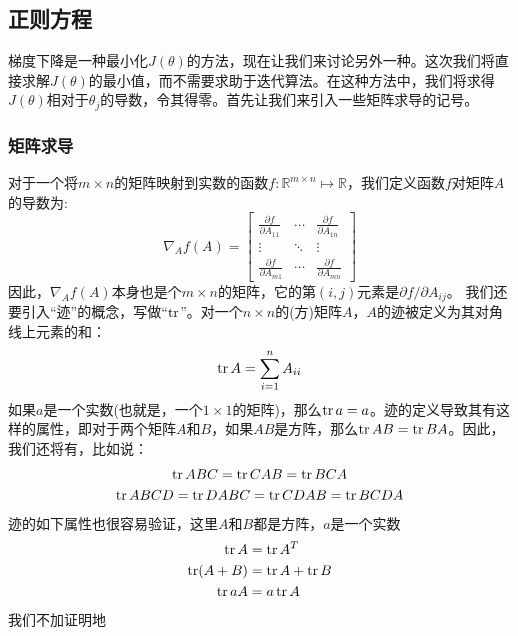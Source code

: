\subsection{正则方程}
梯度下降是一种最小化$J(\theta)$的方法，现在让我们来讨论另外一种。这次我们将直接求解$J(\theta)$的最小值，而不需要求助于迭代算法。在这种方法中，我们将求得$J(\theta)$相对于$\theta_j$的导数，令其得零。首先让我们来引入一些矩阵求导的记号。

\subsubsection{矩阵求导}
对于一个将$m \times n$的矩阵映射到实数的函数$f:\mathbb R^{m \times n} \mapsto \mathbb R$，我们定义函数$f$对矩阵$A$的导数为:
\begin{equation}
\nabla_Af(A) = 
\begin{bmatrix}
\frac{\partial f}{\partial A_{11}} & \cdots & \frac{\partial f}{\partial A_{1n}} \\
\vdots & \ddots & \vdots \\
\frac{\partial f}{\partial A_{m1}} & \cdots & \frac{\partial f}{\partial A_{mn}}
\end{bmatrix}
\end{equation}
因此，$\nabla_Af(A)$本身也是个$m \times n$的矩阵，它的第$(i, j)$元素是$\partial f/\partial A_{ij}$。
我们还要引入“迹”的概念，写做``$\operatorname{tr}$''。对一个$n \times n$的(方)矩阵$A$，$A$的迹被定义为其对角线上元素的和：
\begin{equation}
\operatorname{tr} A = \sum_{i = 1}^nA_{ii}
\end{equation}
如果$a$是一个实数(也就是，一个$1 \times 1$的矩阵)，那么$\operatorname{tr} a = a$。迹的定义导致其有这样的属性，即对于两个矩阵$A$和$B$，如果$AB$是方阵，那么$\operatorname{tr} AB = \operatorname{tr} BA$。因此，我们还将有，比如说：
\begin{gather*}
\operatorname{tr} ABC = \operatorname{tr} CAB = \operatorname{tr} BCA \\
\operatorname{tr} ABCD = \operatorname{tr} DABC = \operatorname{tr} CDAB = \operatorname{tr} BCDA
\end{gather*}
迹的如下属性也很容易验证，这里$A$和$B$都是方阵，$a$是一个实数
\begin{align}
\operatorname{tr} A &= \operatorname{tr} A^T \\
\operatorname{tr} (A + B) &= \operatorname{tr} A + \operatorname{tr} B \\
\operatorname{tr} aA &= a\operatorname{tr} A
\end{align}
我们不加证明地
